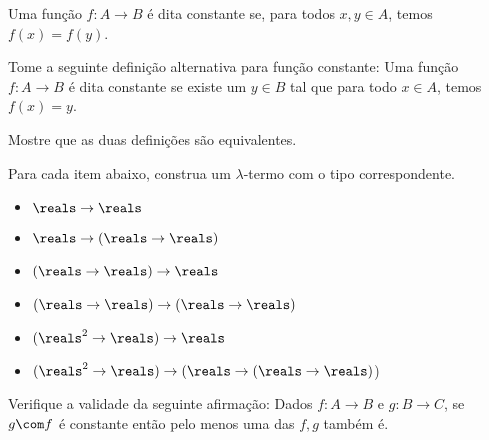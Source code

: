 \begin{definition}
Uma função $f : A \to B$ é dita constante se, para todos $x,y \in A$, temos $f(x) = f(y)$.
\end{definition}

\begin{exercise}
Tome a seguinte definição alternativa para função constante:
Uma função $f : A \to B$ é dita constante se existe um $y \in B$ tal que para todo $x \in A$, temos $f(x) = y$.

Mostre que as duas definições são equivalentes.
\end{exercise}

\begin{exercise}
Para cada item abaixo, construa um $\lambda$-termo com o tipo correspondente.
\begin{itemize}
    \item $\reals \to \reals$
    \item $\reals \to (\reals \to \reals)$
    \item $(\reals \to \reals) \to \reals$
    \item $(\reals \to \reals) \to (\reals \to \reals)$
    \item $(\reals^2 \to \reals) \to \reals$
    \item $(\reals^2 \to \reals) \to (\reals \to (\reals \to \reals)$)
\end{itemize}
\end{exercise}

\begin{exercise}
Verifique a validade da seguinte afirmação:
Dados $f : A \to B$ e $g : B \to C$, se $g \com f$ é constante então pelo menos uma das $f,g$ também é.
\end{exercise}
